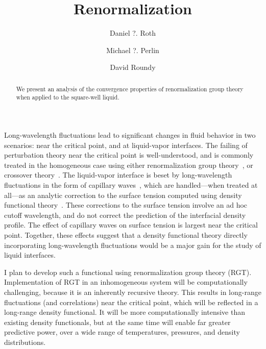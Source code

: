 \documentclass[letterpaper,twocolumn,amsmath,amssymb,pre,aps,10pt]{revtex4-1}
\begin{document}
\title{Renormalization}

\author{Daniel ?. Roth}
\author{Michael ?. Perlin}
\author{David Roundy}

\begin{abstract}
  We present an analysis of the convergence properties of
  renormalization group theory  when applied to the square-well
  liquid.
\end{abstract}

\maketitle

Long-wavelength fluctuations lead to significant changes in fluid
behavior in two scenarios: near the critical point, and at
liquid-vapor interfaces.  The failing of perturbation theory near the
critical point is well-understood, and is commonly treated in the
homogeneous case using either renormalization group
theory~\cite{white2000global, white2001global, del2002vapour,
  kiselev2002computer, reiner2002hierarchical, mi2004renormalization,
  mi2004improved, fu2006study, giacometti2009liquid, jiuxun2005simple,
  forte2011application, el2008integral, ramana2012generalized}, or
crossover theory~\cite{kiselev1999crossover, kiselev2000crossover,
  kiselev2001crossover, kiselev2000simplified, hu2003crossover,
  hu2003back, mccabe2004crossover, llovell2006global}.  The
liquid-vapor interface is beset by long-wavelength fluctuations in the
form of capillary waves~\cite{buff1965interfacial,
  weeks1989consistency}, which are handled---when treated at all---as
an analytic correction to the surface tension computed using density
functional theory~\cite{wadewitz2000application, winkelmann2001liquid,
  gross2009density}.  These corrections to the surface tension involve
an ad hoc cutoff wavelength, and do not correct the prediction of the
interfacial density profile.  The effect of capillary waves on surface
tension is largest near the critical point.  Together, these effects
suggest that a density functional theory directly incorporating
long-wavelength fluctuations would be a major gain for the study of
liquid interfaces.

I plan to develop such a functional using renormalization group theory
(RGT).  Implementation of RGT in an inhomogeneous system will be
computationally challenging, because it is an inherently recursive
theory.  This results in long-range fluctuations (and correlations)
near the critical point, which will be reflected in a long-range
density functional.  It will be more computationally
intensive than existing density functionals, but at the same time will
enable far greater predictive power, over a wide range of
temperatures, pressures, and density distributions.
\end{document}
